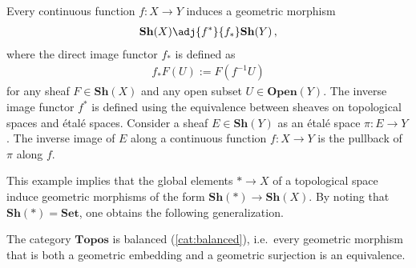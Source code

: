     \begin{example}\label{topos:topological_spaces}
        Every continuous function $f:X\rightarrow Y$ induces a geometric morphism
        \begin{gather}
            \mathbf{Sh}(X)\adj{f^*}{f_*}\mathbf{Sh}(Y)\,,
        \end{gather}
        where the direct image functor $f_*$ is defined as
        \begin{gather}
            f_*F(U) := F(f^{-1}U)
        \end{gather}
        for any sheaf $F\in\mathbf{Sh}(X)$ and any open subset $U\in\mathbf{Open}(Y)$. The inverse image functor $f^*$ is defined using the equivalence between sheaves on topological spaces and \'etal\'e spaces. Consider a sheaf $E\in\mathbf{Sh}(Y)$ as an \'etal\'e space $\pi:E\rightarrow Y$. The inverse image of $E$ along a continuous function $f:X\rightarrow Y$ is the pullback of $\pi$ along $f$.
    \end{example}

    This example implies that the global elements $\ast\rightarrow X$ of a topological space induce geometric morphisms of the form $\mathbf{Sh}(\ast)\rightarrow\mathbf{Sh}(X)$. By noting that $\mathbf{Sh}(\ast)=\mathbf{Set}$, one obtains the following generalization.


    \begin{property}[Balanced]
        The category $\mathbf{Topos}$ is balanced (\cref{cat:balanced}), i.e.~every geometric morphism that is both a geometric embedding and a geometric surjection is an equivalence. 
    \end{property}

